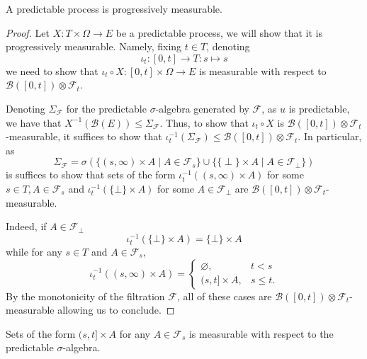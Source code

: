 \begin{lemma}\label{lem:Predictable.progressive}
  \mathlibok
A predictable process is progressively measurable.
\end{lemma}

\begin{proof}\leanok
Let $X : T \times \Omega \to E$ be a predictable process, we will show that it is progressively measurable. Namely, fixing $t \in T$, denoting
$$\iota_t : [0, t] \to T : s \mapsto s$$
we need to show that $\iota_t \circ X : [0, t] \times \Omega \to E$ is measurable with respect to $\mathcal{B}([0, t]) \otimes \mathcal{F}_t$.

Denoting $\Sigma_{\mathcal{F}}$ for the predictable $\sigma$-algebra generated by $\mathcal{F}$, as $u$ is predictable, we have that $X^{-1}(\mathcal{B}(E)) \le \Sigma_{\mathcal{F}}$. Thus, to show that $\iota_t \circ X$ is $\mathcal{B}([0, t]) \otimes \mathcal{F}_t$-measurable, it suffices to show that $\iota_t^{-1}(\Sigma_{\mathcal{F}}) \le \mathcal{B}([0, t]) \otimes \mathcal{F}_t$. In particular, as
$$\Sigma_{\mathcal{F}} = \sigma(\{(s, \infty) \times A \mid A \in \mathcal{F}_s\} \cup \{\{\perp\} \times A \mid A \in \mathcal{F}_\perp\})$$
is suffices to show that sets of the form $\iota_t^{-1}((s, \infty) \times A)$ for some $s \in T, A \in \mathcal{F}_s$ and $\iota_t^{-1}(\{\bot\} \times A)$ for some $A \in \mathcal{F}_\bot$ are $\mathcal{B}([0, t]) \otimes \mathcal{F}_t$-measurable.

Indeed, if $A \in \mathcal{F}_\bot$
$$\iota_t^{-1}(\{\bot\} \times A) = \{\bot\} \times A$$
while for any $s \in T$ and $A \in \mathcal{F}_s$,
$$\iota_t^{-1}((s, \infty) \times A) = \begin{cases}
    \varnothing, & t < s\\
    (s, t] \times A, & s \le t.
\end{cases}$$
By the monotonicity of the filtration $\mathcal{F}$, all of these cases are $\mathcal{B}([0, t]) \otimes \mathcal{F}_t$-measurable allowing us to conclude.
\end{proof}


\begin{lemma}\label{lem:predictable_Ioc_prod}
  \mathlibok
Sets of the form $(s, t] \times A$ for any $A \in \mathcal{F}_s$ is measurable with respect to the predictable $\sigma$-algebra.
\end{lemma}

